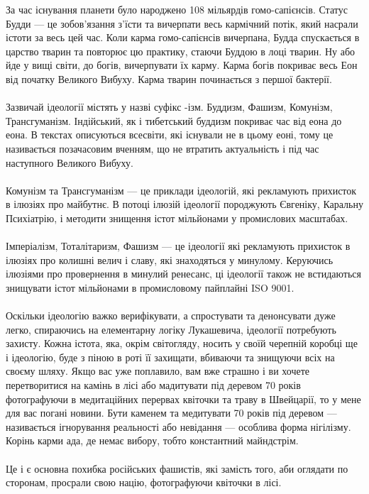 \newpage
За час існування планети було народжено 108 мільярдів гомо-сапієнсів.
Статус Будди --- це зобов'язання з'їсти та вичерпати весь кармічний потік, який насрали істоти за весь цей час.
Коли карма гомо-сапієнсів вичерпана, Будда спускається в царство тварин та повторює цю практику, стаючи Буддою в лоці тварин.
Ну або йде у вищі світи, до богів, вичерпувати їх карму.
Карма богів покриває весь Еон від початку Великого Вибуху. Карма тварин починається з першої бактерії.
\\
\\
Зазвичай ідеології містять у назві суфікс -ізм. Буддизм, Фашизм, Комунізм, Трансгуманізм.
Індійський, як і тибетський буддизм покриває час від еона до еона. В текстах описуються
всесвіти, які існували не в цьому еоні, тому це називається позачасовим вченням, що не втратить
актуальність і під час наступного Великого Вибуху.
\\
\\
Комунізм та Трансгуманізм --- це приклади ідеологій, які рекламують прихисток в ілюзіях про майбутнє.
В потоці ілюзій ідеології породжують Євгеніку, Каральну Психіатрію, і методити знищення істот мільйонами
у промислових масштабах.
\\
\\
Імперіалізм, Тоталітаризм, Фашизм --- це ідеології які рекламують прихисток в ілюзіях
про колишні велич і славу, які знаходяться у минулому. Керуючись ілюзіями про провернення
в минулий ренесанс, ці ідеології також не встидаються знищувати істот мільйонами в промисловому пайплайні ISO 9001.
\\
\\
Оскільки ідеологію важко верифікувати, а спростувати та денонсувати дуже легко, спираючись на елементарну логіку
Лукашевича, ідеології потребують захисту. Кожна істота, яка, окрім світогляду, носить у своїй черепній коробці
ще і ідеологію, буде з піною в роті її захищати, вбиваючи та знищуючи всіх на своєму шляху.
Якщо вас уже поплавило, вам вже страшно і ви хочете перетворитися на камінь в лісі або мадитувати під деревом 70 років
фотографуючи в медитаційних перервах квіточки та траву в Швейцарії, то у мене для вас погані новини.
Бути каменем та медитувати 70 років під деревом --- називається ігнорування реальності або невідання ---
особлива форма нігілізму. Корінь карми ада, де немає вибору, тобто константний майндстрім.
\\
\\
Це і є основна похибка російських фашистів, які замість того, аби оглядати по сторонам, просрали свою націю,
фотографуючи квіточки в лісі.
